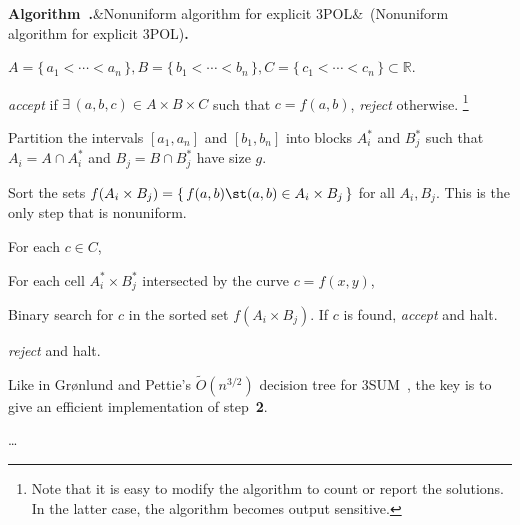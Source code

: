 \documentclass{article}
\newcounter{algorithm}[section]
\renewcommand{\thealgorithm}{\arabic{section}.\arabic{algorithm}}%
\begin{document}
%
 \par%
 \vspace{.5\baselineskip\@plus.2\baselineskip\@minus.2\baselineskip}%
\noindent\textbf{Algorithm~\thealgorithm}\ifx&Nonuniform algorithm for explicit 3POL&\else~(Nonuniform algorithm for explicit 3POL)\fi\textbf{.}%
\vspace{0.1cm}%
\begin{adjustwidth}{0.3cm}{0cm}%
\begin{description}%
\setlength{\itemsep}{0pt}%
\setlength{\parskip}{0pt}%
\setlength{\parsep}{0pt}%
\label{algo:ne}
\item[input] $A = \{\,a_1 < \cdots < a_n\,\},B = \{\,b_1<\cdots<b_n\,\},
    C = \{\,c_1<\cdots<c_n\,\}
    \subset \mathbb{R}$.
\item[output] \emph{accept} if $\exists\, (a,b,c) \in A \times B \times C$ such that $c
    = f(a,b)$, \emph{reject} otherwise.%
    \footnote{Note that it is easy to modify the algorithm to count or report the
    solutions. In the latter case, the algorithm becomes output sensitive.}
\item[1.] Partition the intervals $[a_1,a_n]$ and $[b_1,b_n]$ into blocks
    $A_i^*$ and $B_j^*$ such that $A_i = A \cap A_i^*$ and $B_j = B
    \cap B_j^*$ have size $g$.
\item[2.] Sort the sets $f(A_i \times B_j) = \{\, f(a,b) \st (a,b) \in A_i
    \times B_j\,\}$ for all $A_i,B_j$. This is the only step that
    is nonuniform.
\item[3.] For each $c \in C$,
\item[3.1.] For each cell $A_i^* \times B_j^*$ intersected by the curve
$c=f(x,y)$,
\item[3.1.1.] Binary search for $c$ in the sorted set $f(A_i \times B_j)$.
If $c$ is found, \emph{accept} and halt.
\item[4.] \emph{reject} and halt.
%
\end{description}%
\end{adjustwidth}%
\vspace{0.1cm}%
%
%

%
Like in Gr\o nlund and Pettie's $\tilde{O}(n^{3/2})$ decision tree for
3SUM~\cite{GP14}, the key is to give an efficient implementation
of step~\textbf{2}.

\dots
\end{document}
